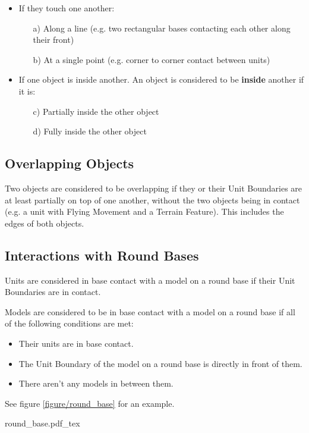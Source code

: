 \begin{itemize}
\item If they touch one another:
\begin{itemize}[label={}]
\item[a)] Along a line (e.g. two rectangular bases contacting each other along their front)
\item[b)] At a single point (e.g. corner to corner contact between units)
\end{itemize}
\item If one object is inside another. An object is considered to be \textbf{inside} another if it is:
\begin{itemize}[label={}]
\item[c)] Partially inside the other object
\item [d)] Fully inside the other object
\end{itemize}
\end{itemize}

\subsection{Overlapping Objects}
\label{overlapping_of_objects}

Two objects are considered to be overlapping if they or their Unit Boundaries are at least partially on top of one another, without the two objects being in contact (e.g. a unit with Flying Movement and a Terrain Feature). This includes the edges of both objects.

\subsection{Interactions with Round Bases}
\label{interactions_with_round_bases}


Units are considered in base contact with a model on a round base if their Unit Boundaries are in contact.

Models are considered to be in base contact with a model on a round base if all of the following conditions are met:
\begin{itemize}
\item Their units are in base contact.
\item The Unit Boundary of the model on a round base is directly in front of them.
\item There aren't any models in between them.
\end{itemize}

See figure \ref{figure/round_base} for an example.

\begin{Figure}
	\centering
	\Fanchor
	\def\svgwidth{0.54\textwidth}
	{round_base.pdf_tex}
	\caption{Base contact between models and a model on round base.\captionposttitle
		The models with a bold frame in unit B are considered to be in base contact with the model A on the round base, since this round base is directly in front of them.%
	}
	\label{figure/round_base}
\end{Figure}

\RBemc

